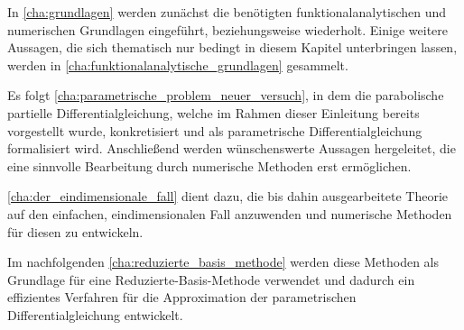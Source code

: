In \autoref{cha:grundlagen} werden zunächst die benötigten funktionalanalytischen und numerischen Grundlagen eingeführt, beziehungsweise wiederholt.
Einige weitere Aussagen, die sich thematisch nur bedingt in diesem Kapitel unterbringen lassen, werden in \autoref{cha:funktionalanalytische_grundlagen} gesammelt.

Es folgt \autoref{cha:parametrische_problem_neuer_versuch}, in dem die parabolische partielle Differentialgleichung, welche im Rahmen dieser Einleitung bereits vorgestellt wurde, konkretisiert und als parametrische Differentialgleichung formalisiert wird.
Anschließend werden wünschenswerte Aussagen hergeleitet, die eine sinnvolle Bearbeitung durch numerische Methoden erst ermöglichen.

\autoref{cha:der_eindimensionale_fall} dient dazu, die bis dahin ausgearbeitete Theorie auf den einfachen, eindimensionalen Fall anzuwenden und numerische Methoden für diesen zu entwickeln.

Im nachfolgenden \autoref{cha:reduzierte_basis_methode} werden diese Methoden als Grundlage für eine Reduzierte-Basis-Methode verwendet und dadurch ein effizientes Verfahren für die Approximation der parametrischen Differentialgleichung entwickelt.



